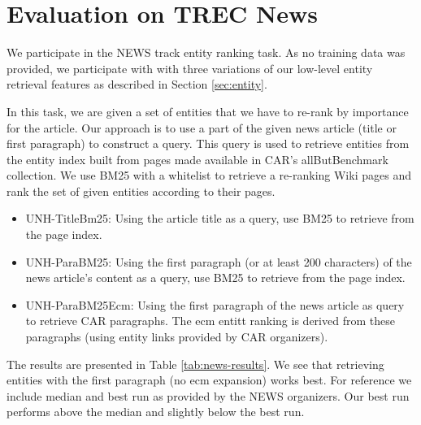 \documentclass{article}
\begin{document}
\section{Evaluation on TREC News}

We participate in the NEWS track entity ranking task. As no training data was provided, we participate with with three variations of our low-level entity retrieval features as described in Section \ref{sec:entity}.

In this task, we are given a set of entities that we have to re-rank by importance for the article. Our approach is to use a part of the given news article (title or first paragraph) to construct a query. This query is used to retrieve entities from the entity index built from pages made available in CAR's allButBenchmark collection. We use BM25 with a whitelist to retrieve a re-ranking Wiki pages and rank the set of given entities according to their pages.

\begin{itemize}
    \item UNH-TitleBm25: Using the article title as a query, use BM25 to retrieve from the page index.  
    \item UNH-ParaBM25: Using the first paragraph (or at least 200 characters) of the news article's content as a query,  use BM25 to retrieve from the page index.  
    \item UNH-ParaBM25Ecm:  Using the first paragraph of the news article as query to retrieve CAR paragraphs. The ecm entitt ranking is derived from these paragraphs (using entity links provided by CAR organizers).
\end{itemize}

% 

The results are presented in Table \ref{tab:news-results}. We see that retrieving entities with the first paragraph (no ecm expansion) works best. For reference we include median and best run as provided by the NEWS organizers. Our best run performs above the median and slightly below the best run.
\end{document}
